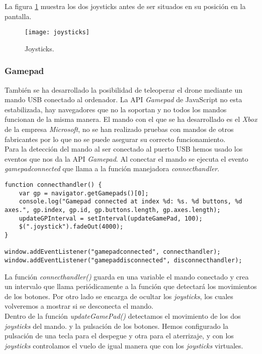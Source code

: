 La figura \ref{fig:joysticks} muestra los dos joysticks antes de ser situados en su posición en la pantalla.\\

\begin{figure}[h!]
\centering
\texttt{[image: joysticks]}
\caption{Joysticks.}
\label{fig:joysticks}
\end{figure}


\subsubsection{Gamepad}

También se ha desarrollado la posibilidad de teleoperar el drone mediante un mando USB conectado al ordenador. La API \emph{Gamepad} de JavaScript no esta estabilizada, hay navegadores que no la soportan y no todos los mandos funcionan de la misma manera. El mando con el que se ha desarrollado es el \emph{Xbox} de la empresa \emph{Microsoft}, no se han realizado pruebas con mandos de otros fabricantes por lo que no se puede asegurar su correcto funcionamiento. \\

Para la detección del mando al ser conectado al puerto USB hemos usado los eventos que nos da la API \emph{Gamepad}. Al conectar el mando se ejecuta el evento \emph{gamepadconnected} que llama a la función manejadora \emph{connecthandler}.\\

\begin{lstlisting}[caption=Detección del mando.]
function connecthandler() {
    var gp = navigator.getGamepads()[0];
    console.log("Gamepad connected at index %d: %s. %d buttons, %d axes.", gp.index, gp.id, gp.buttons.length, gp.axes.length);
    updateGPInterval = setInterval(updateGamePad, 100);
    $(".joystick").fadeOut(4000);
}

window.addEventListener("gamepadconnected", connecthandler);
window.addEventListener("gamepaddisconnected", disconnecthandler);
\end{lstlisting}

La función \emph{connecthandler()} guarda en una variable el mando conectado y crea un intervalo que llama periódicamente a la función que detectará los movimientos de los botones. Por otro lado se encarga de ocultar los \emph{joysticks}, los cuales volveremos a mostrar si se desconecta el mando.\\

Dentro de la función \emph{updateGamePad()} detectamos el movimiento de los dos \emph{joysticks} del mando. y la pulsación de los botones. Hemos configurado la pulsación de una tecla para el despegue y otra para el aterrizaje, y con los \emph{joysticks} controlamos el vuelo de igual manera que con los \emph{joysticks} virtuales.\\


